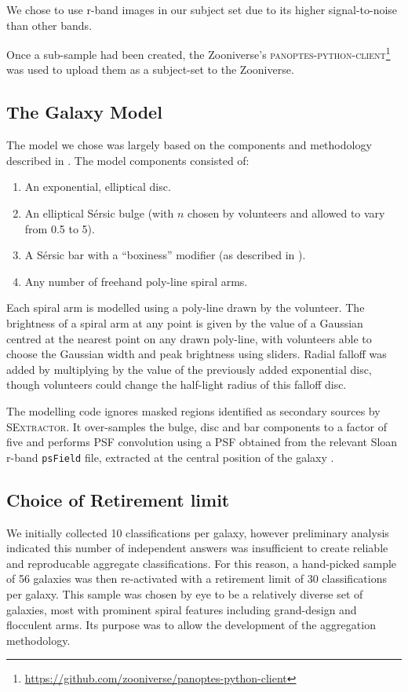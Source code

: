 \documentclass[../main.tex]{subfiles}
\begin{document}
We chose to use r-band images in our subject set due to its higher signal-to-noise than other bands.

Once a sub-sample had been created, the Zooniverse's \textsc{panoptes-python-client}\footnote{\url{https://github.com/zooniverse/panoptes-python-client}} was used to upload them as a subject-set to the Zooniverse.


\subsection{The Galaxy Model}
\label{section:galaxy-model}

The model we chose was largely based on the components and methodology described in \citet{galfit-paper}. The model components consisted of:
\begin{enumerate}
\item An exponential, elliptical disc.
\item An elliptical S\'ersic bulge (with $n$ chosen by volunteers and allowed to vary from 0.5 to 5).
\item A S\'ersic bar with a ``boxiness'' modifier (as described in \citealt{galfit-paper}).
\item Any number of freehand poly-line spiral arms.
\end{enumerate}

Each spiral arm is modelled using a poly-line drawn by the volunteer. The brightness of a spiral arm at any point is given by the value of a Gaussian centred at the nearest point on any drawn poly-line, with volunteers able to choose the Gaussian width and peak brightness using sliders. Radial falloff was added by multiplying by the value of the previously added exponential disc, though volunteers could change the half-light radius of this falloff disc.

The modelling code ignores masked regions identified as secondary sources by \textsc{SExtractor}. It over-samples the bulge, disc and bar components to a factor of five and performs PSF convolution using a PSF obtained from the relevant Sloan r-band \texttt{psField} file, extracted at the central position of the galaxy \citep{2002AJ....123..485S}.

\subsection{Choice of Retirement limit}
\label{sec:retirement-limit}

We initially collected 10 classifications per galaxy, however preliminary analysis indicated this number of independent answers was insufficient to create reliable and reproducable aggregate classifications. For this reason, a hand-picked sample of 56 galaxies was then re-activated with a retirement limit of 30 classifications per galaxy. This sample was chosen by eye to be a relatively diverse set of galaxies, most with prominent spiral features including grand-design and flocculent arms. Its purpose was to allow the development of the aggregation methodology.
\end{document}
